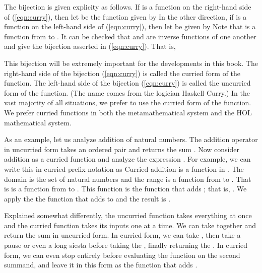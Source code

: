 \documentclass[cup9a]{cupbook}
\begin{document}
The bijection is given explicity as follows.  If  is a function
on the right-hand side of (\ref{eqn:curry}), then let 
be the function given by 
In the other direction, if  is a function on the left-hand side of (\ref{eqn:curry}), then let  be given by
Note that  is a function from  to .
It can be  checked that  and  are inverse functions of one another and give the bijection asserted in (\ref{eqn:curry}).
That is,

This bijection will be extremely important for the developments in this book.  The right-hand side of the bijection (\ref{eqn:curry}) is called the curried form of the function.  The left-hand side of the bijection (\ref{eqn:curry}) is called the uncurried form of the function.  (The name comes from the logician Haskell Curry.)   In the vast majority of all situations, we prefer to use the curried form of the function.  We prefer curried functions in both the metamathematical system and the HOL mathematical system.

As an example, let us analyze addition of natural numbers.  The addition operator in uncurried form takes an ordered pair  and
returns the sum .   Now consider addition as a curried function and analyze the expression .  For example, we can write this in curried prefix notation as
Curried addition is a function in .  The domain
is the set of natural numbers and the range is a function from  to .
That is  is a function from  to .  This function is the function that adds ; that is, .  We apply the
the function that adds  to  and the result is .

Explained somewhat differently, the uncurried function takes everything at once and the curried function takes its inputs one at a time.  We can take  together and return the sum  in uncurried form.  In curried form, we can take , then take a pause or even a long siesta before taking the , finally returning the .  In curried form, we can even stop entirely before evaluating the function  on the second summand, and leave it in this form as the function that adds .
\end{document}
